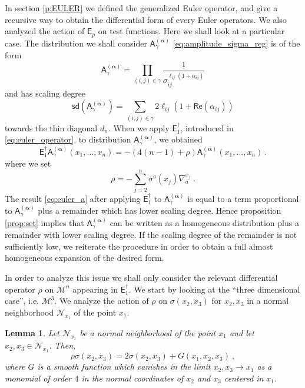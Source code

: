 \documentclass[11pt]{book}
\newcommand{\sd}{\mathsf{sd}}
\renewcommand{\Re}{\mathsf{Re}}
\newcommand{\alphabd}{\boldsymbol{\alpha}}
\newcommand{\Mcal}{\mathcal{M}}
\newcommand{\Ncal}{\mathcal{N}}
\newcommand{\Asf}{\mathsf{A}}
\newcommand{\Esf}{\mathsf{E}}
\theoremstyle{break}
\newtheorem{lemma}{Lemma}[chapter]
\begin{document}
In section \ref{p:EULER} we defined the generalized Euler operator, and give a recursive way to obtain the differential form of every Euler operators. We also analyzed the action of $\Esf_p$ on test functions. Here we shall look at a particular case. The distribution we shall consider $\Asf^{(\alphabd)}_\gamma$ \eqref{eq:amplitude_sigma_reg} is of the form
%
\begin{equation*}
\Asf_\gamma^{(\alphabd)}=\prod_{(i,j)\in\gamma} \frac{1}{\sigma_{ij}^{\ell_{ij}(1+ \alpha_{ij})}} 
\end{equation*}
%
and has scaling degree 
%
\begin{equation*}
\sd(\Asf_\gamma^{(\alphabd)}) = \sum_{(i,j)\in\gamma} 2 \ell_{ij}\left(1+ \Re(\alpha_{ij})\right) 
\end{equation*}
%
towards the thin diagonal $d_n$. When we apply $\Esf^\dagger_1$, introduced in \eqref{eq:euler_operator}, to distribution $\Asf_\gamma^{(\alphabd)}$, we obtained
%
\begin{equation}
\Esf_1^\dagger  \Asf_\gamma^{(\alphabd)}(x_1,\dots,x_n) = - \left( 4(n-1) + \rho \right) \Asf_\gamma^{(\alphabd)}(x_1,\dots,x_n) \ .
\label{eq:euler_a}
\end{equation}
%
where we set
%
\begin{equation}
\rho = - \sum_{j=2}^n \sigma^a(x_j) \nabla^{x_j}_a \ .    
\label{eq:rho}
\end{equation}
%
The result \eqref{eq:euler_a} after applying $\Esf_1^\dagger$ to $\Asf_\gamma^{(\alphabd)}$ is equal to a term proportional to $\Asf_\gamma^{(\alphabd)}$ plus a remainder which has lower scaling degree. Hence proposition \ref{prop:set} implies that $\Asf_\gamma^{(\alphabd)}$ can be written as a homogeneous distribution plus a remainder with lower scaling degree. If the scaling degree of the remainder is not sufficiently low, we reiterate the procedure in order to obtain a full almost homogeneous expansion of the desired form.


\bigskip


In order to analyze this issue we shall only consider the relevant differential operator $\rho$ on $\Mcal^n$ appearing in $\Esf_1^\dagger$. We start by looking at the ``three dimensional case'', i.e.  $\Mcal^3$. We analyze the action of $\rho$ on $\sigma(x_2,x_3)$ for $x_2,x_3$ in a normal neighborhood $\Ncal_{x_1}$ of the point $x_1$.


\begin{lemma}\label{lem:rho_over_squared}
Let $\Ncal_{x_1}$ be a normal neighborhood of the point $x_1$ and let $x_2,x_3 \in \Ncal_{x_1}$. Then,
%
\begin{equation*}
\rho \sigma(x_2,x_3) = 2\sigma(x_2,x_3) + G(x_1,x_2,x_3) \ ,
\end{equation*}
%
where $G$ is a smooth function which vanishes in the limit $x_2,x_3 \to x_1$ as a monomial of order $4$ in the normal coordinates of $x_2$ and $x_3$ centered in $x_1$. 
\end{lemma}
\end{document}
